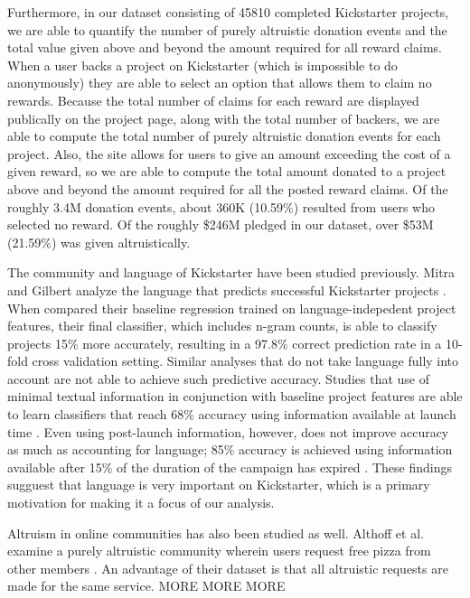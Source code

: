 \documentclass[letterpaper]{article}
\begin{document}
Furthermore, in our dataset consisting of 45810 completed Kickstarter projects, we are able to quantify the number of purely altruistic donation events and the total value given above and beyond the amount required for all reward claims. When a user backs a project on Kickstarter (which is impossible to do anonymously) they are able to select an option that allows them to claim no rewards. Because the total number of claims for each reward are displayed publically on the project page, along with the total number of backers, we are able to compute the total number of purely altruistic donation events for each project. Also, the site allows for users to give an amount exceeding the cost of a given reward, so we are able to compute the total amount donated to a project above and beyond the amount required for all the posted reward claims. Of the roughly 3.4M donation events, about 360K (10.59\%) resulted from users who selected no reward. Of the roughly \$246M pledged in our dataset, over \$53M (21.59\%) was given altruistically.

The community and language of Kickstarter have been studied previously. Mitra and Gilbert analyze the language that predicts successful Kickstarter projects \cite{mitra2014language}. When compared their baseline regression trained on language-indepedent project features, their final classifier, which includes n-gram counts, is able to classify projects 15\% more accurately, resulting in a 97.8\% correct prediction rate in a 10-fold cross validation setting. Similar analyses that do not take language fully into account are not able to achieve such predictive accuracy. Studies that use of minimal textual information in conjunction with baseline project features are able to learn classifiers that reach 68\% accuracy using information available at launch time \cite{greenberg2013crowdfunding}. Even using post-launch information, however, does not improve accuracy as much as accounting for language; 85\% accuracy is achieved using information available after 15\% of the duration of the campaign has expired \cite{etter2013launch}. These findings sugguest that language is very important on Kickstarter, which is a primary motivation for making it a focus of our analysis.

Altruism in online communities has also been studied as well. Althoff et al. examine a purely altruistic community wherein users request free pizza from other members \cite{althoff2014ask}. An advantage of their dataset is that all altruistic requests are made for the same service. MORE MORE MORE
\end{document}
